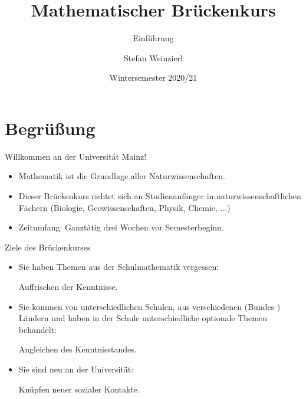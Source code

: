 \documentclass[german]{beamer}
\title{Mathematischer Br\"uckenkurs}
\subtitle{Einf\"uhrung}
\author{Stefan Weinzierl}
\institute[Uni Mainz]{Institut f\"ur Physik, Universit\"at Mainz}%
\date[WiSe 2020/21]{Wintersemester 2020/21}
\begin{document}

\begin{frame}
  \titlepage
\end{frame}


\section{Begr\"u{\ss}ung}

\begin{frame}{Willkommen an der Universit\"at Mainz!}

\begin{itemize}
\item Mathematik ist die Grundlage aller Naturwissenschaften.

\item Dieser Br\"uckenkurs richtet sich an Studienanf\"anger 
in naturwissenschaftlichen F\"achern (Biologie, Geowissenschaften, Physik, Chemie, ...)

\item Zeitumfang: Ganzt\"atig drei Wochen vor Semesterbeginn.

\end{itemize}
\end{frame}

\begin{frame}{Ziele des Br\"uckenkurses}

\begin{itemize}
\item Sie haben Themen aus der Schulmathematik vergessen: 

\alert{Auffrischen der Kenntnisse}.

\item Sie kommen von unterschiedlichen Schulen, aus verschiedenen (Bundes-) L\"andern
und haben in der Schule unterschiedliche optionale Themen behandelt:

\alert{Angleichen des Kenntnisstandes}.

\item Sie sind neu an der Universit\"at:

\alert{Kn\"upfen neuer sozialer Kontakte}.

\end{itemize}
\end{frame}
\end{document}
